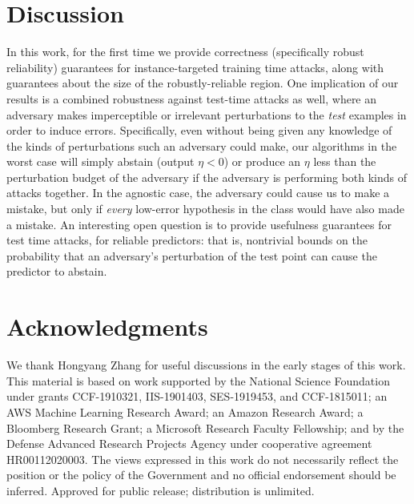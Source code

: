 \documentclass[11pt]{article}
\newcommand{\0}{\mathbf{0}}
\newcommand{\1}{\mathbf{1}}
\begin{document}
\section{Discussion}
In this work, for the first time we provide correctness (specifically robust reliability) guarantees for instance-targeted training time attacks, along with
guarantees about the size of the robustly-reliable region.
One implication of our results is a combined robustness against test-time attacks as well, where an adversary makes imperceptible or irrelevant perturbations to the {\em test} examples in order to induce errors. Specifically, even without being given any knowledge of the kinds of perturbations such an adversary could make, our algorithms in the worst case will simply abstain (output $\eta<0$) or produce an $\eta$ less than the perturbation budget of the adversary if the adversary is performing both kinds of attacks together. In the agnostic case, the adversary could cause us to make a mistake, but only if {\em every} low-error hypothesis in the class would have also made a mistake. An interesting open question is to provide usefulness guarantees for test time attacks, for reliable predictors: that is, nontrivial bounds on the probability
that an adversary's perturbation of the test point
can cause the predictor to abstain.

\section*{Acknowledgments}
We thank Hongyang Zhang for useful discussions in the early stages of this work.
 This material is based on work supported by the National Science Foundation under grants  CCF-1910321, IIS-1901403, SES-1919453, and CCF-1815011; an AWS Machine Learning Research Award; an Amazon  Research Award; a Bloomberg Research Grant; a Microsoft Research Faculty Fellowship; and by the Defense Advanced Research Projects Agency under cooperative agreement HR00112020003.
 The views expressed in this work do not necessarily reflect the position or the policy of the Government and no official endorsement should be inferred. Approved for public release; distribution is unlimited.
\end{document}
